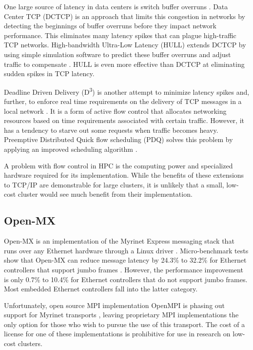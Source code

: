 \documentclass[11pt]{book}
\begin{document}

One large source of latency in data centers is switch buffer overruns \cite{liu-13}.  Data
Center TCP (DCTCP) \cite{} is an approach that limits this congestion in networks by detecting the
beginnings of buffer overruns before they impact network performance.  This eliminates many
latency spikes that can plague high-traffic TCP networks.  High-bandwidth Ultra-Low Latency
(HULL) extends DCTCP by using simple simulation software to predict these buffer overruns
and adjust traffic to compensate \cite{liu-13}. HULL is even more effective than DCTCP at
eliminating sudden spikes in TCP latency.

Deadline Driven Delivery (D\textsuperscript{3}) \cite{} is another attempt to minimize
latency spikes and, further, to enforce real time requirements on the delivery of TCP
messages in a local network \cite{liu-13}.  It is a form of active flow control that
allocates networking resources based on time requirements associated with certain traffic.
However, it has a tendency to starve out some requests when traffic becomes heavy.
Preemptive Distributed Quick flow scheduling (PDQ) \cite{} solves this problem by applying
an improved scheduling algorithm \cite{liu-13}.

A problem with flow control in HPC is the computing power and specialized hardware
required for its implementation.  While the benefits of these extensions to TCP/IP are
demonstrable for large clusters, it is unlikely that a small, low-cost cluster would see
much benefit from their implementation.

\subsection{Open-MX}

Open-MX is an implementation of the Myrinet Express messaging stack that runs over any
Ethernet hardware through a Linux driver \cite{goglin-08}.  Micro-benchmark tests show
that Open-MX can reduce message latency by 24.3\% to 32.2\% for Ethernet controllers that
support jumbo frames \cite{goglin-11}.  However, the performance improvement is only 0.7\%
to 10.4\% for Ethernet controllers that do not support jumbo frames.  Most embedded
Ethernet controllers fall into the latter category.

Unfortunately, open source MPI implementation OpenMPI is phasing out support for Myrinet
transports \cite{openmpi-myrinet}, leaving proprietary MPI implementations the only option
for those who wish to pursue the use of this transport.  The cost of a license for one of
these implementations is prohibitive for use in research on low-cost clusters.
\end{document}
